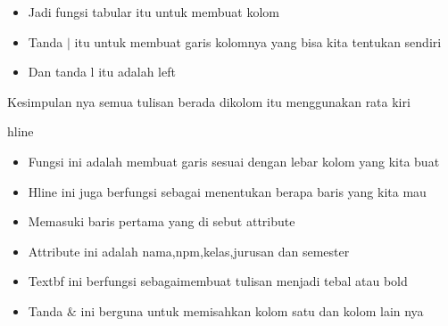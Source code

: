 \vspace{\baselineskip}
\begin{itemize}
	\item Jadi fungsi tabular itu untuk membuat kolom
\end{itemize}\par
\vspace{\baselineskip}
\begin{itemize}
	\item Tanda $ \vert $ itu untuk membuat garis kolomnya yang bisa kita tentukan sendiri\par
\vspace{\baselineskip}
	\item Dan tanda l itu adalah left
\end{itemize}\par

\vspace{\baselineskip}

\noindent Kesimpulan nya semua tulisan berada dikolom itu menggunakan rata kiri\par


\noindent hline\par

\vspace{\baselineskip}

\begin{itemize}
	\vspace{\baselineskip}
	\item Fungsi ini adalah membuat garis sesuai dengan lebar kolom yang kita buat\par
\vspace{\baselineskip}
	\item Hline ini juga berfungsi sebagai menentukan berapa baris yang kita mau
	\vspace{\baselineskip}
\end{itemize}\par

\begin{itemize}
\vspace{\baselineskip}
	\item Memasuki baris pertama yang di sebut attribute\par
\vspace{\baselineskip}
	\item Attribute ini adalah nama,npm,kelas,jurusan dan semester\par
\vspace{\baselineskip}
	\item Textbf ini berfungsi sebagaimembuat tulisan menjadi tebal atau bold\par
\vspace{\baselineskip}
	\item Tanda $\&$ ini berguna untuk memisahkan kolom satu dan kolom lain nya
	
\end{itemize}\par

